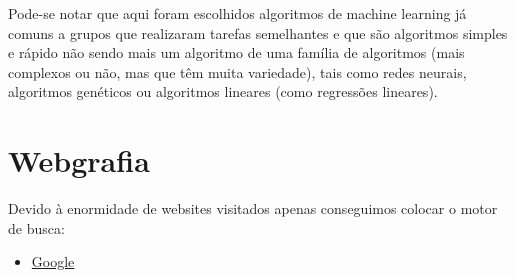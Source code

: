\documentclass[a4paper,10pt]{article}
\begin{document}
Pode-se notar que aqui foram escolhidos algoritmos de machine learning já comuns a grupos que realizaram tarefas semelhantes e que são algoritmos simples e rápido não sendo mais um algoritmo de uma família de algoritmos (mais complexos ou não, mas que têm muita variedade), tais como redes neurais, algoritmos genéticos ou algoritmos lineares (como regressões lineares).

\section{Webgrafia}

Devido à enormidade de websites visitados apenas conseguimos colocar o motor de busca:
\begin{itemize}
    \item \href{https://www.google.com/}{Google}
\end{itemize}
\end{document}
